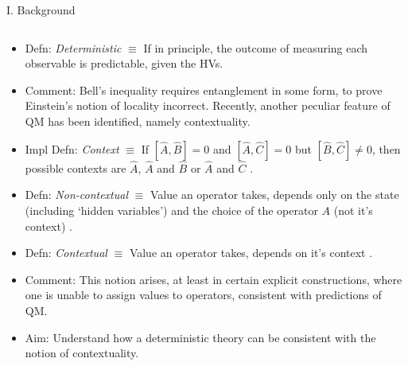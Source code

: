 \documentclass[final,hyperref={pdfpagelabels=false}]{beamer}
\begin{document}
\begin{frame}[t]
\begin{columns}[c]
\begin{column}{.31\textwidth}
\begin{block}{I. Background}
\begin{columns}
\begin{column}{0.7\textwidth}
\begin{itemize}
            \item Defn: \emph{Deterministic} $\equiv$ If in principle, the outcome of measuring each observable is predictable, given the HVs. %

            \item Comment: Bell's inequality requires entanglement in some form, to prove Einstein's notion of locality incorrect. Recently, another peculiar feature of QM has been identified, namely contextuality. 

            \item Impl Defn: \emph{Context} $\equiv$ If $[\hat A,\hat B]=0$ and $[\hat A,\hat C]=0$ but $[\hat B,\hat C]\neq 0$, then possible contexts are {$\hat A$}, {$\hat A$ and $\hat B$} or {$\hat A$ and $\hat C$} \cite{peresBook}.

            \item Defn: \emph{Non-contextual} $\equiv$ Value an operator takes, depends only on the state (including `hidden variables') and the choice of the operator $A$ (not it's context) \cite{peresBook}.

            \item Defn: \emph{Contextual} $\equiv$ Value an operator takes, depends on it's context \cite{peresBook}.

            \item Comment: This notion arises, at least in certain explicit constructions, where one is unable to assign values to operators, consistent with predictions of QM.

            \item Aim: Understand how a deterministic theory can be consistent with the notion of contextuality.

            \end{itemize}
          \end{column}


\end{columns}
\end{block}
\end{column}
\end{columns}
\end{frame}
\end{document}
